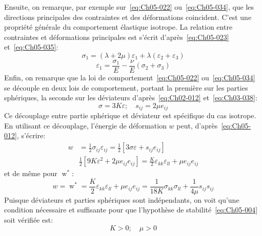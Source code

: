 Ensuite, on remarque, par exemple sur~\eqref{eq:Ch05-022} ou~\eqref{eq:Ch05-034}, que les directions principales des contraintes et des déformations coincident.
C'est une propriété générale du comportement élastique isotrope.
La relation entre contraintes et déformations principales est s'écrit d'après~\eqref{eq:Ch05-023} et~\eqref{eq:Ch05-035}: 
\begin{equation}
    \sigma_1 = \left( \lambda + 2 \mu \right) \varepsilon_1 + \lambda \left( \varepsilon_2 + \varepsilon_3 \right)
    \label{eq:Ch05-037}
\end{equation}
\begin{equation}
    \varepsilon_1 = \frac{\sigma_1}{E} - \frac{\nu}{E} \left( \sigma_2 + \sigma_3 \right)
    \label{eq:Ch05-038}
\end{equation}
Enfin, on remarque que la loi de comportement~\eqref{eq:Ch05-022} ou~\eqref{eq:Ch05-034} se découple en deux lois de comportement, portant la première sur les parties sphériques, la seconde sur les déviateurs d'après~\eqref{eq:Ch02-012} et~\eqref{eq:Ch03-038}:
\begin{equation}
    \sigma = 3 K \varepsilon; \quad s_{ij} = 2 \mu e_{ij}
    \label{eq:Ch05-039}
\end{equation}
Ce découplage entre partie sphérique et déviateur est spécifique du cas isotrope.
En utilisant ce découplage, l'énergie de déformation $w$ peut, d'après~\eqref{eq:Ch05-012}, s'écrire: 
\begin{equation*}
    \begin{split}
        w &= \frac{1}{2} \sigma_{ij} \varepsilon_{ij} = \frac{1}{2} \left[ 3 \sigma \varepsilon + s_{ij} e_{ij} \right] \\
        & \frac{1}{2} \left[ 9 K \varepsilon^2 + 2\mu e_{ij} e_{ij} \right] = \frac{K}{2} \varepsilon_{kk} \varepsilon_{ll} + \mu e_{ij} e_{ij}
    \end{split}
\end{equation*}
et de même pour $\mathop{w}^*$:
\begin{equation}
    w=\mathop{w}^* = \frac{K}{2} \varepsilon_{kk} \varepsilon_{ll} + \mu e_{ij} e_{ij} = \frac{1}{18K} \sigma_{kk} \sigma_{ll} + \frac{1}{4\mu} s_{ij} s_{ij}
    \label{eq:Ch05-049}
\end{equation}
Puisque déviateurs et parties sphériques sont indépendants, on voit qu'une condition nécessaire et suffisante pour que l'hypothèse de stabilité~\eqref{eq:Ch05-004} soit vérifiée est: 
\begin{equation}
    K>0; \quad \mu >0
    \label{eq:Ch05-050}
\end{equation}
